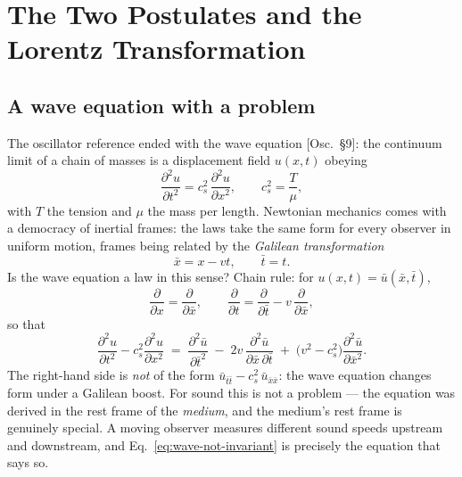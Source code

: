 \documentclass[11pt]{article}
\theoremstyle{plain}
\theoremstyle{definition}
\theoremstyle{remark}
\newcommand{\pd}[2]{\frac{\partial #1}{\partial #2}}
\begin{document}
\section{The Two Postulates and the Lorentz Transformation}
\label{sec:postulates}

\subsection{A wave equation with a problem}
\label{sec:wave-problem}

The oscillator reference ended with the wave equation [Osc.\ \S9]: the
continuum limit of a chain of masses is a displacement field $u(x,t)$
obeying
\begin{equation}
  \pd{^2 u}{t^2} = c_s^2\, \pd{^2 u}{x^2},
  \qquad c_s^2 = \frac{T}{\mu},
  \label{eq:wave-eq}
\end{equation}
with $T$ the tension and $\mu$ the mass per length. Newtonian mechanics
comes with a democracy of inertial frames: the laws take the same form
for every observer in uniform motion, frames being related by the
\emph{Galilean transformation}
\begin{equation}
  \bar x = x - vt, \qquad \bar t = t .
  \label{eq:galilean}
\end{equation}
Is the wave equation a law in this sense? Chain rule: for
$u(x,t) = \bar u(\bar x,\bar t)$,
\begin{equation}
  \pd{}{x} = \pd{}{\bar x},
  \qquad
  \pd{}{t} = \pd{}{\bar t} - v\,\pd{}{\bar x},
\end{equation}
so that
\begin{equation}
  \pd{^2 u}{t^2} - c_s^2 \pd{^2 u}{x^2}
  \;=\;
  \pd{^2 \bar u}{\bar t^2}
  \;-\; 2v\,\frac{\partial^2 \bar u}{\partial\bar x\,\partial\bar t}
  \;+\; \bigl(v^2 - c_s^2\bigr)\pd{^2 \bar u}{\bar x^2}.
  \label{eq:wave-not-invariant}
\end{equation}
The right-hand side is \emph{not} of the form
$\bar u_{\bar t\bar t} - c_s^2\,\bar u_{\bar x\bar x}$: the wave equation
changes form under a Galilean boost. For sound this is not a problem --- the
equation was derived in the rest frame of the \emph{medium}, and the
medium's rest frame is genuinely special. A moving observer measures
different sound speeds upstream and downstream, and
Eq.~\eqref{eq:wave-not-invariant} is precisely the equation that says so.
\end{document}
